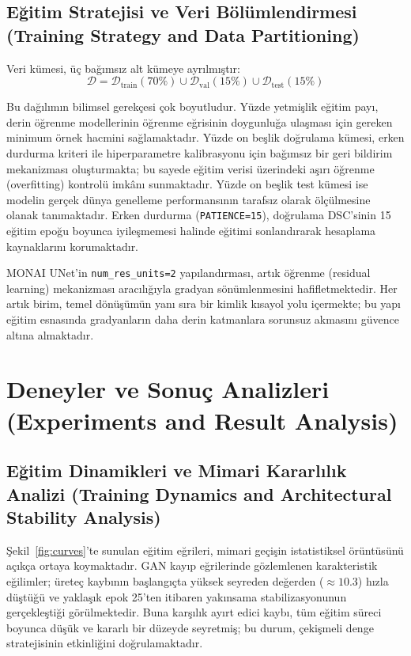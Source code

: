\documentclass[10pt,journal,compsoc]{IEEEtran}
\begin{document}
\subsection{Eğitim Stratejisi ve Veri Bölümlendirmesi \textnormal{\small{(Training Strategy and Data Partitioning)}}}

Veri kümesi, üç bağımsız alt kümeye ayrılmıştır:
\begin{equation}
\mathcal{D} = \mathcal{D}_{\text{train}}(70\%) \cup \mathcal{D}_{\text{val}}(15\%) \cup \mathcal{D}_{\text{test}}(15\%)
\end{equation}

Bu dağılımın bilimsel gerekçesi çok boyutludur. Yüzde yetmişlik eğitim payı, derin öğrenme modellerinin öğrenme eğrisinin doygunluğa ulaşması için gereken minimum örnek hacmini sağlamaktadır. Yüzde on beşlik doğrulama kümesi, erken durdurma kriteri ile hiperparametre kalibrasyonu için bağımsız bir geri bildirim mekanizması oluşturmakta; bu sayede eğitim verisi üzerindeki aşırı öğrenme (overfitting) kontrolü imkânı sunmaktadır. Yüzde on beşlik test kümesi ise modelin gerçek dünya genelleme performansının tarafsız olarak ölçülmesine olanak tanımaktadır. Erken durdurma (\texttt{PATIENCE=15}), doğrulama DSC'sinin 15 eğitim epoğu boyunca iyileşmemesi halinde eğitimi sonlandırarak hesaplama kaynaklarını korumaktadır.

MONAI UNet'in \texttt{num\_res\_units=2} yapılandırması, artık öğrenme (residual learning) mekanizması aracılığıyla gradyan sönümlenmesini hafifletmektedir. Her artık birim, temel dönüşümün yanı sıra bir kimlik kısayol yolu içermekte; bu yapı eğitim esnasında gradyanların daha derin katmanlara sorunsuz akmasını güvence altına almaktadır.

\section{Deneyler ve Sonuç Analizleri \textnormal{\small{(Experiments and Result Analysis)}}}

\subsection{Eğitim Dinamikleri ve Mimari Kararlılık Analizi \textnormal{\small{(Training Dynamics and Architectural Stability Analysis)}}}

Şekil~\ref{fig:curves}'te sunulan eğitim eğrileri, mimari geçişin istatistiksel örüntüsünü açıkça ortaya koymaktadır. GAN kayıp eğrilerinde gözlemlenen karakteristik eğilimler; üreteç kaybının başlangıçta yüksek seyreden değerden ($\approx 10.3$) hızla düştüğü ve yaklaşık epok 25'ten itibaren yakınsama stabilizasyonunun gerçekleştiği görülmektedir. Buna karşılık ayırt edici kaybı, tüm eğitim süreci boyunca düşük ve kararlı bir düzeyde seyretmiş; bu durum, çekişmeli denge stratejisinin etkinliğini doğrulamaktadır.
\end{document}

